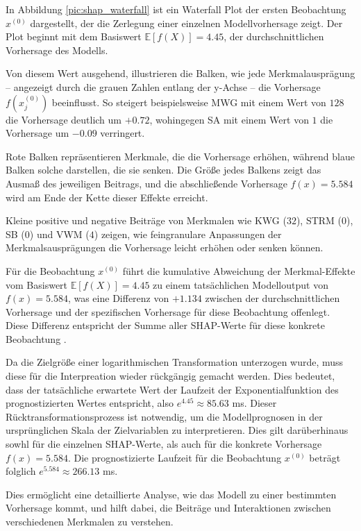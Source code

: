 In Abbildung \ref{pic:shap_waterfall} ist ein Waterfall Plot der ersten Beobachtung $x^{(0)}$ dargestellt, 
der die Zerlegung einer einzelnen Modellvorhersage zeigt. Der Plot beginnt mit dem Basiswert $\mathbb{E}[f(X)] = 4.45$, 
der durchschnittlichen Vorhersage des Modells. 

Von diesem Wert ausgehend, illustrieren die Balken, wie jede Merkmalausprägung – 
angezeigt durch die grauen Zahlen entlang der y-Achse – die Vorhersage $f(x_{j}^{(0)})$ beeinflusst. 
So steigert beispielsweise MWG mit einem Wert von $128$ die Vorhersage deutlich um $+0.72$, 
wohingegen SA mit einem Wert von $1$ die Vorhersage um $-0.09$ verringert.

Rote Balken repräsentieren Merkmale, die die Vorhersage erhöhen, während blaue Balken solche 
darstellen, die sie senken. Die Größe jedes Balkens zeigt das Ausmaß des jeweiligen Beitrags, 
und die abschließende Vorhersage $f(x) = 5.584$ wird am Ende der Kette dieser Effekte erreicht. 

Kleine positive und negative Beiträge von Merkmalen wie KWG ($32$), STRM ($0$), SB ($0$) und VWM ($4$) 
zeigen, wie feingranulare Anpassungen der Merkmalsausprägungen die Vorhersage leicht erhöhen oder senken können.

Für die Beobachtung $x^{(0)}$ führt die kumulative Abweichung der Merkmal-Effekte 
vom Basiswert $\mathbb{E}[f(X)] = 4.45$ zu einem tatsächlichen Modelloutput von $f(x) = 5.584$, 
was eine Differenz von $+1.134$ zwischen der durchschnittlichen Vorhersage 
und der spezifischen Vorhersage für diese Beobachtung offenlegt. 
Diese Differenz entspricht der Summe aller SHAP-Werte für diese konkrete Beobachtung \cite[S. 52f]{Molnar_2023}.

Da die Zielgröße einer logarithmischen Transformation unterzogen wurde, muss diese für die Interpreation wieder rückgängig gemacht werden. 
Dies bedeutet, dass der tatsächliche erwartete Wert der Laufzeit der Exponentialfunktion des prognostizierten Wertes entspricht, also $e^{4.45} \approx 85.63$ ms. 
Dieser Rücktransformationsprozess ist notwendig, um die Modellprognosen in der ursprünglichen Skala der Zielvariablen zu interpretieren.
Dies gilt darüberhinaus sowhl für die einzelnen SHAP-Werte, als auch für die konkrete Vorhersage $f(x) = 5.584$. 
Die prognostizierte Laufzeit für die Beobachtung $x^{(0)}$ beträgt folglich $e^{5.584} \approx 266.13$ ms.

Dies ermöglicht eine detaillierte Analyse, wie das Modell zu einer bestimmten Vorhersage kommt, 
und hilft dabei, die Beiträge und Interaktionen zwischen verschiedenen Merkmalen zu verstehen.

